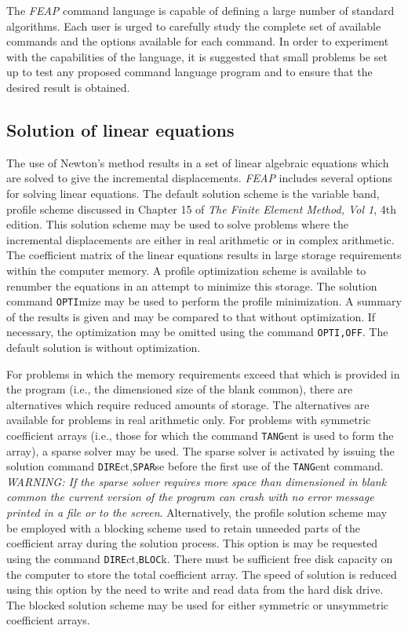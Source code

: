 The {\sl FEAP} command language is
capable of defining a large number of standard algorithms.  Each user is urged
to carefully study the complete set of available commands and the options
available for each command.
In order to experiment with the capabilities of the language, it is suggested
that small problems be set up to test any proposed command language program
and to ensure that the desired result is obtained.

\subsection{Solution of linear equations}
\label{eqsoln}

The use of Newton's method results in a set of linear algebraic equations
which are solved to give the incremental displacements.  {\sl FEAP} includes
several options for solving linear equations.  The default solution scheme
is the variable band, profile scheme discussed in
Chapter 15 of {\it The Finite Element Method, Vol 1}, 4th edition.
This solution scheme may be used to solve problems where the incremental
displacements are either in real arithmetic or in complex arithmetic.  The
coefficient matrix of the linear equations results in large storage requirements
within the computer memory.  A profile optimization scheme is available to
renumber the equations in an attempt to minimize this storage.  The solution
command {\tt OPTI}\-mize may be used to perform the profile minimization.
A summary of the results is given and may be compared to that without
optimization.  If necessary, the optimization may be omitted using
the command {\tt OPTI,OFF}.  The default solution is without optimization.

For problems in which the memory requirements exceed that which is provided
in the program (i.e., the dimensioned size of the blank common), there are
alternatives which require reduced amounts of storage.  The alternatives
are available for problems in real arithmetic only.  For problems with
symmetric coefficient arrays (i.e., those for which the command {\tt TANG}ent
is used to form the array), a sparse solver may be used.  The sparse solver
is activated by issuing the solution command {\tt DIRE}ct,{\tt SPAR}se before
the first use of the {\tt TANG}ent command.  {\it WARNING: If the sparse
solver requires more space than dimensioned in blank common the current
version of the program can crash with no error message printed in a file
or to the screen}.  Alternatively, the profile solution scheme may be
employed with a blocking scheme used to retain unneeded parts of the
coefficient array during the solution process.  This option is may be
requested using the command {\tt DIRE}ct,{\tt BLOC}k.  There must be
sufficient free disk capacity on the computer to store the total coefficient
array.  The speed of solution is reduced using this option by the need
to write and read data from the hard disk drive.  The blocked solution scheme
may be used for either symmetric or unsymmetric coefficient arrays.

